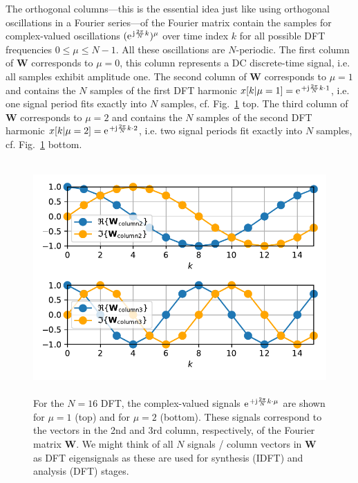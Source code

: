 \documentclass[11pt,a4paper,DIV=12]{scrartcl}
\begin{document}
%
The orthogonal columns---this is the essential idea just like using
orthogonal oscillations in a Fourier series---of the Fourier matrix contain
the samples for complex-valued
oscillations $(\e^{\im \frac{2\pi}{N} k})^\mu$ over time index $k$ for all possible
DFT frequencies $0 \leq \mu \leq N-1$.
%
All these oscillations are $N$-periodic.
%
The first column of $\bm W$ corresponds to $\mu=0$, this column represents a DC discrete-time
signal, i.e. all samples exhibit amplitude one.
%
The second column of $\bm W$ corresponds to $\mu=1$ and contains the $N$ samples of the
first DFT harmonic $x[k|\mu=1]=\e^{+\im \frac{2\pi}{N} k \cdot 1}$,
i.e. one signal period fits exactly into $N$ samples, cf.
Fig.~\ref{fig:dft_eigensignals_columns} top.
%
The third column of $\bm W$ corresponds to $\mu=2$ and contains the $N$ samples of the
second DFT harmonic $x[k|\mu=2]=\e^{+\im \frac{2\pi}{N} k \cdot 2}$,
i.e. two signal periods fit exactly into $N$ samples, cf.
Fig.~\ref{fig:dft_eigensignals_columns} bottom.
%
\begin{figure}[t]
		\centering
		\includegraphics[width=5in, height=3.5in]{graphics/dft_eigensignals_columns.pdf}
		\caption{For the $N=16$ DFT, the complex-valued signals
    $\e^{+ \im \frac{2\pi}{N} k \cdot\mu}$ are shown for $\mu=1$ (top) and for
    $\mu=2$ (bottom).
    These signals correspond to the vectors in the 2nd and 3rd column,
    respectively, of the Fourier matrix $\bm W$.
    We might think of all $N$ signals / column vectors in $\bm W$ as DFT eigensignals
    as these are used for synthesis (IDFT) and analysis (DFT) stages.}
		\label{fig:dft_eigensignals_columns}
\end{figure}
\end{document}
